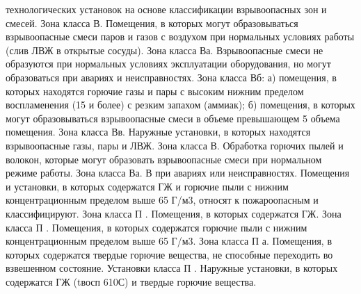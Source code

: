 технологических установок на основе классификации взрывоопасных зон и смесей. Зона класса В. Помещения,
в которых могут образовываться взрывоопасные смеси паров и газов с воздухом при нормальных условиях работы
(слив ЛВЖ в открытые сосуды). Зона класса Ва. Взрывоопасные смеси не образуются при нормальных условиях
эксплуатации оборудования, но могут образоваться при авариях и неисправностях. Зона класса Вб: а) помещения,
в которых находятся горючие газы и пары с высоким нижним пределом воспламенения (15 и более) с резким запахом
(аммиак); б) помещения, в которых могут образовываться взрывоопасные смеси в объеме превышающем 5 объема
помещения. Зона класса Вв. Наружные установки, в которых находятся взрывоопасные газы, пары и ЛВЖ. Зона класса
В. Обработка горючих пылей и волокон, которые могут образовать взрывоопасные смеси при
нормальном режиме работы. Зона класса Ва. В при авариях или неисправностях. Помещения и установки, в которых
содержатся ГЖ и горючие пыли с нижним концентрационным пределом выше 65 Г/м3, относят к пожароопасным и классифицируют.
Зона класса П . Помещения, в которых содержатся ГЖ. Зона класса П . Помещения, в которых содержатся горючие пыли
с нижним концентрационным пределом выше 65 Г/м3. Зона класса П а. Помещения, в которых содержатся твердые горючие
вещества, не способные переходить во взвешенном состояние. Установки класса П . Наружные установки, в которых
содержатся ГЖ (tвосп 610С) и твердые горючие вещества.

